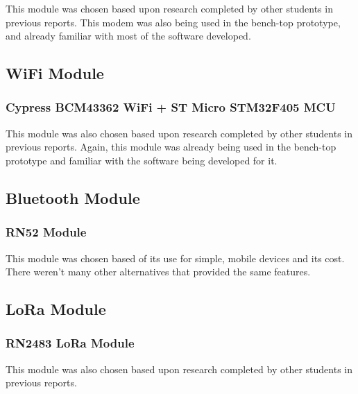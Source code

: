 	This module was chosen based upon research completed by other students in previous reports. 
This modem was also being used in the bench-top prototype, and already familiar with most of the software developed. 

\subsection{WiFi Module}
\subsubsection{Cypress BCM43362 WiFi + ST Micro STM32F405 MCU}
		This module was also chosen based upon research completed by other students in previous reports. 
Again, this module was already being used in the bench-top prototype and familiar with the software being developed for it. 


\subsection{Bluetooth Module}
\subsubsection{RN52 Module}
	This module was chosen based of its use for simple, mobile devices and its cost. 
There weren't many other alternatives that provided the same features. 


\subsection{LoRa Module}
\subsubsection{RN2483 LoRa Module}
	This module was also chosen based upon research completed by other students in previous reports.


